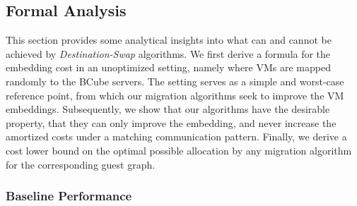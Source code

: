 \documentclass[conference]{IEEEtran}
\begin{document}
\subsection{Formal Analysis}

This section provides some analytical insights into what can and cannot be achieved by \emph{Destination-Swap} algorithms.
We first derive a formula for the embedding cost in an unoptimized setting, namely where VMs are mapped randomly to the
BCube servers. The setting serves as a simple and worst-case reference point, from which our migration algorithms
seek to improve the VM embeddings. Subsequently, we show that our algorithms have the desirable property, that
they can only improve the embedding, and never increase the amortized costs under a matching communication pattern. Finally, we derive a cost lower bound
on the optimal possible allocation by any migration algorithm for the corresponding guest graph.

\subsubsection{Baseline Performance}
\end{document}
